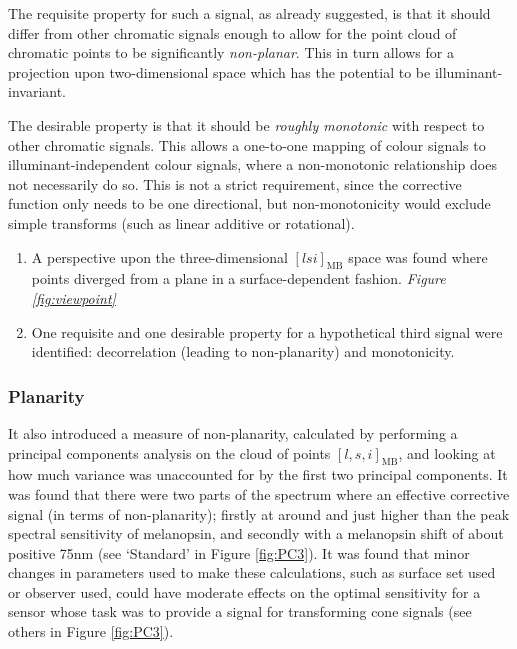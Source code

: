 The requisite property for such a signal, as already suggested, is that it should differ from other chromatic signals enough to allow for the point cloud of chromatic points to be significantly \emph{non-planar}. This in turn allows for a projection upon two-dimensional space which has the potential to be illuminant-invariant.

The desirable property is that it should be \emph{roughly monotonic} with respect to other chromatic signals. This allows a one-to-one mapping of colour signals to illuminant-independent colour signals, where a non-monotonic relationship does not necessarily do so. This is not a strict requirement, since the corrective function only needs to be one directional, but non-monotonicity would exclude simple transforms (such as linear additive or rotational).

\begin{enumerate}
    \item A perspective upon the three-dimensional $[lsi]_{\text{MB}}$ space was found where points diverged from a plane in a surface-dependent fashion. \emph{Figure \ref{fig:viewpoint}}
    \item One requisite and one desirable property for a hypothetical third signal were identified: decorrelation (leading to non-planarity) and monotonicity. 
\end{enumerate}



\subsubsection{Planarity}

It also introduced a measure of non-planarity, calculated by performing a principal components analysis on the cloud of points $[l,s,i]_{\text{MB}}$, and looking at how much variance was unaccounted for by the first two principal components. It was found that there were two parts of the spectrum where an effective corrective signal (in terms of non-planarity); firstly at around and just higher than the peak spectral sensitivity of melanopsin, and secondly with a melanopsin shift of about positive 75nm (see `Standard' in Figure \ref{fig:PC3}). It was found that minor changes in parameters used to make these calculations, such as surface set used or observer used, could have moderate effects on the optimal sensitivity for a sensor whose task was to provide a signal for transforming cone signals (see others in Figure \ref{fig:PC3}).

